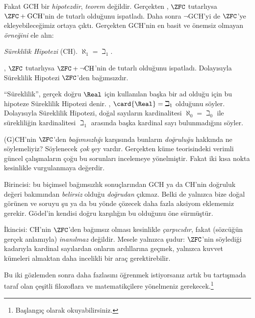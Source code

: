 Fakat GCH bir \emph{hipotezdir}, \emph{teorem} değildir. Gerçekten
\citet{Godel1938}, $\ZFC$ tutarlıysa $\ZFC+\text{GCH}$'nin de tutarlı
olduğunu ispatladı. Daha sonra $\lnot$GCH'yi de $\ZFC$'ye ekleyebileceğimiz
ortaya çıktı. Gerçekten GCH'nin en basit ve önemsiz olmayan \emph{örneğini}
ele alın:

\begin{defish}
\emph{Süreklilik Hipotezi} (CH). $\aleph_1=\beth_1$.
\end{defish}

\citet{Cohen1963}, $\ZFC$ tutarlıysa $\ZFC+\lnot\text{CH}$'nin de
tutarlı olduğunu ispatladı. Dolayısıyla Süreklilik Hipotezi $\ZFC$'den
bağımsızdır.

``Süreklilik'', gerçek doğru $\Real$ için kullanılan başka bir ad olduğu
için bu hipoteze Süreklilik Hipotezi denir.
, $\card{\Real}=\beth_1$ olduğunu söyler.
Dolayısıyla Süreklilik Hipotezi, doğal sayıların kardinalitesi
$\aleph_0=\beth_0$ ile sürekliliğin kardinalitesi $\beth_1$ arasında
başka kardinal sayı bulunmadığını söyler.

(G)CH'nin $\ZFC$'den \emph{bağımsızlığı} karşısında bunların
\emph{doğruluğu} hakkında ne söylemeliyiz? Söylenecek \emph{çok} şey
vardır. Gerçekten küme teorisindeki verimli güncel çalışmaların çoğu bu
sorunları incelemeye yönelmiştir. Fakat iki kısa nokta kesinlikle
vurgulanmaya değerdir.

Birincisi: bu biçimsel bağımsızlık sonuçlarından GCH ya da CH'nin doğruluk
değeri bakımından \emph{belirsiz} olduğu \emph{doğrudan} çıkmaz. Belki de
yalnızca bize doğal görünen ve soruyu şu ya da bu yönde çözecek daha fazla
aksiyom eklememiz gerekir. Gödel'in kendisi doğru karşılığın bu olduğunu
öne sürmüştür.

İkincisi: CH'nin $\ZFC$'den bağımsız olması kesinlikle \emph{çarpıcıdır},
fakat (sözcüğün gerçek anlamıyla) \emph{inanılmaz} değildir. Mesele
yalnızca şudur: $\ZFC$'nin söylediği kadarıyla kardinal sayılardan onların
ardıllarına geçmek, yalnızca kuvvet kümeleri almaktan daha incelikli bir
araç gerektirebilir.

Bu iki gözlemden sonra daha fazlasını öğrenmek istiyorsanız artık bu
tartışmada taraf olan çeşitli filozoflara ve matematikçilere yönelmeniz
gerekecek.\footnote{Başlangıç olarak
\citet[\S15.6]{Potter2004} okuyabilirsiniz.}

